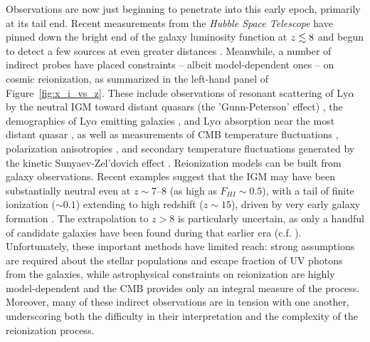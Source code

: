 \documentclass[preprint]{aastex}
\begin{document}
Observations are now just beginning to penetrate into this early epoch, primarily at its tail end.  Recent 
measurements from the {\it Hubble Space Telescope} have pinned down the bright end of the galaxy luminosity function 
at $z \lesssim 8$ \citep{bouwens_et_al2010, schenker_et_al2013} and begun to detect a few sources at even greater 
distances \citep{ellis_et_al2013, oesch_et_al2013}.  Meanwhile, a number of indirect probes have placed constraints -- 
albeit model-dependent ones -- on cosmic reionization, as summarized in the left-hand panel of 
Figure~\ref{fig:x_i_vs_z}. These include observations of resonant scattering of Ly$\alpha$ by the neutral IGM toward
distant quasars (the 'Gunn-Peterson' effect) \citep{fan_et_al2006}, the demographics of Ly$\alpha$ emitting 
galaxies \citep{schenker_et_al2012, treu_et_al2013,Faisst_et_al2014}, and Ly$\alpha$ absorption near the most distant quasar 
\citep{bolton_et_al2011}, as well as measurements of CMB temperature fluctuations \citep{planck_et_al2013}, 
polarization anisotropies \citep{page_et_al2007}, and secondary temperature fluctuations generated by the 
kinetic Sunyaev-Zel'dovich effect \citep{zahn_et_al2012_trunc, mesinger_et_al2012}.  Reionization models can be 
built from galaxy observations.  Recent examples suggest that the IGM may have been substantially neutral even at 
$z \sim 7$--8 (as high as $F_{HI} \sim 0.5$), with a tail of finite ionization ($\sim 0.1$) extending to high 
redshift ($z \sim 15$), driven by very early galaxy formation \citep{robertson_2013}.  The extrapolation to 
$z>8$ is particularly uncertain, as only a handful of candidate galaxies have been found during that earlier 
era (c.f. \citealt{oesch_et_al2013}).  Unfortunately, these important methods have limited reach: strong assumptions 
are required about the stellar populations and escape fraction of UV photons from the galaxies, while astrophysical 
constraints on reionization are highly model-dependent and the CMB provides only an integral measure of the process. 
Moreover, many of these indirect observations are in tension with one another, underscoring both the difficulty in 
their interpretation and the complexity of the reionization process.
\end{document}
